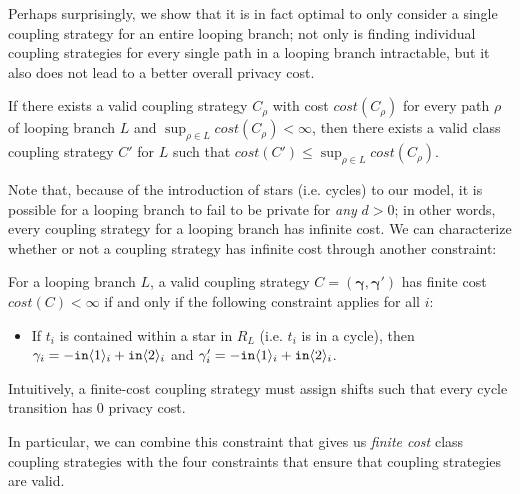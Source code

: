 Perhaps surprisingly, we show that it is in fact optimal to only consider a single coupling strategy for an entire looping branch; not only is finding individual coupling strategies for every single path in a looping branch intractable, but it also does not lead to a better overall privacy cost. 

\begin{prop}\label{ClassCouplingStrategiesAreEnoughProp}
    If there exists a valid coupling strategy $C_\rho$ with cost $cost(C_\rho)$ for every path $\rho$ of looping branch $L$ and $\sup_{\rho\in L}cost(C_\rho)< \infty$, then there exists a valid class coupling strategy $C'$ for $L$ such that $cost(C') \leq \sup_{\rho\in L}cost(C_\rho)$. 
\end{prop}

Note that, because of the introduction of stars (i.e. cycles) to our model, it is possible for a looping branch to fail to be private for \textit{any} $d>0$; in other words, every coupling strategy for a looping branch has infinite cost. We can characterize whether or not a coupling strategy has infinite cost through another constraint:

\begin{lemma}\label{finiteCostConstraintLemma}
    For a looping branch $L$, a valid coupling strategy $C = (\mathbf{\gamma}, \mathbf{\gamma}')$ has finite cost $cost(C)<\infty$ if and only if the following constraint applies for all $i$:
    \begin{itemize}
        \item If $t_i$ is contained within a star in $R_L$ (i.e. $t_i$ is in a cycle), then $\gamma_i = -\texttt{in}\langle1 \rangle_i+\texttt{in}\langle2 \rangle_i$ and $\gamma_i' = -\texttt{in}\langle1 \rangle_i+\texttt{in}\langle2 \rangle_i$.
    \end{itemize}
\end{lemma}

Intuitively, a finite-cost coupling strategy must assign shifts such that every cycle transition has 0 privacy cost. 


In particular, we can combine this constraint that gives us \textit{finite cost} class coupling strategies with the four constraints that ensure that coupling strategies are valid.

